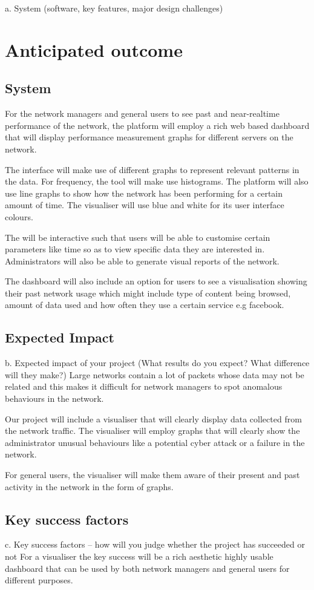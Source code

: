 a. System (software, key features, major design challenges) 

\section{Anticipated outcome}
\subsection{System}
For the network managers and general users to see past and near-realtime performance of the network, the platform will employ a rich web based dashboard that will display performance measurement graphs for different servers on the network.

The interface will make use of different graphs to represent relevant patterns in the data. For frequency, the tool will make use histograms. The platform will also use line graphs to show how the network has been performing for a certain amount of time. The visualiser will use blue and white for its user interface colours.

The will be interactive such that users will be able to customise certain parameters like time so as to view specific data they are interested in. Administrators will also be able to generate visual reports of the network.

The dashboard will also include an option for users to see a visualisation showing their past network usage which might include type of content being browsed, amount of data used and how often they use a certain service e.g facebook.




\subsection{Expected Impact}
b. Expected impact of your project (What results do you expect? What difference will they make?)
Large networks contain a lot of packets whose data may not be related and this makes it difficult for network managers to spot anomalous behaviours in the network.

Our project will include a visualiser that will clearly display data collected from the network traffic. The visualiser will employ graphs that will clearly show the administrator unusual behaviours like a potential cyber attack or a failure in the network.

For general users, the visualiser will make them aware of their present and past activity in the network in the form of graphs.

\subsection{Key success factors}
c. Key success factors – how will you judge whether the project has succeeded or not
For a visualiser the key success will be a rich aesthetic highly usable dashboard that can be used by both network managers and general users for different purposes.

